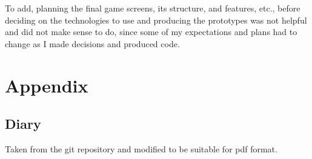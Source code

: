 \documentclass[]{final}
\begin{document}
To add, planning the final game screens, its structure, and features, etc., before
deciding on the technologies to use and producing the prototypes was not helpful and
did not make sense to do, since some of my expectations and plans had to change as I
made decisions and produced code.


\newpage
{}


\chapter{Appendix}
\section{Diary}
Taken from the git repository and modified to be suitable for pdf format.
\end{document}
